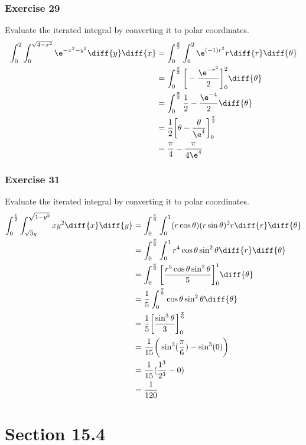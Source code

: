 \documentclass{math}
\begin{document}
\subsubsection*{Exercise 29}
Evaluate the iterated integral by converting it to polar coordinates.
\begin{align*}
  \int_{0}^{2}\int_{0}^{\sqrt{4-x^2}}\e^{-x^2-y^2}\diff{y}\diff{x} &=
    \int_{0}^{\frac{\pi}{2}}\int_{0}^{2}\e^{(-1)r^2}r\diff{r}\diff{\theta} \\
  &= \int_{0}^{\frac{\pi}{2}}
    \bigg[-\frac{\e^{-r^2}}{2}\bigg]_{0}^{2}\diff{\theta} \\
  &= \int_{0}^{\frac{\pi}{2}}\frac{1}{2}-\frac{\e^{-4}}{2}\diff{\theta} \\
  &= \frac{1}{2}\bigg[\theta-\frac{\theta}{\e^4}\bigg]_{0}^{\frac{\pi}{2}} \\
  &= \frac{\pi}{4}-\frac{\pi}{4\e^4}
\end{align*}

\subsubsection*{Exercise 31}
Evaluate the iterated integral by converting it to polar coordinates.
\begin{align*}
  \int_{0}^{\frac{1}{2}}\int_{\sqrt{3}y}^{\sqrt{1-y^2}}xy^2\diff{x}\diff{y} &=
    \int_{0}^{\frac{\pi}{6}}\int_{0}^{1}
      (r\cos\theta)(r\sin\theta)^2r\diff{r}\diff{\theta} \\
  &= \int_{0}^{\frac{\pi}{6}}\int_{0}^{1}
    r^4\cos\theta\sin^2\theta\diff{r}\diff{\theta} \\
  &= \int_{0}^{\frac{\pi}{6}}
    \bigg[\frac{r^5\cos\theta\sin^2\theta}{5}\bigg]_{0}^{1}\diff{\theta} \\
  &= \frac{1}{5}\int_{0}^{\frac{\pi}{6}}
    \cos\theta\sin^2\theta\diff{\theta} \\
  &= \frac{1}{5}\bigg[\frac{\sin^3\theta}{3}\bigg]_{0}^{\frac{\pi}{6}} \\
  &= \frac{1}{15}\bigg(\sin^3(\frac{\pi}{6})-\sin^3(0)\bigg) \\
  &= \frac{1}{15}(\frac{1^3}{2^3}-0) \\
  &= \frac{1}{120}
\end{align*}

\section*{Section 15.4}
\end{document}
